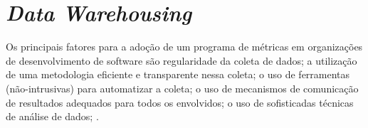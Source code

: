 \chapter{\textit{Data Warehousing}} 

Os principais fatores para a adoção de um programa de métricas em 
organizações de desenvolvimento de software são
regularidade da coleta de dados;
a utilização de uma metodologia eficiente e transparente nessa coleta; 
o uso de ferramentas (não-intrusivas) para automatizar a coleta; 
o uso de mecanismos de comunicação de resultados adequados para todos os envolvidos; 
o uso de sofisticadas técnicas de análise de dados;
.



